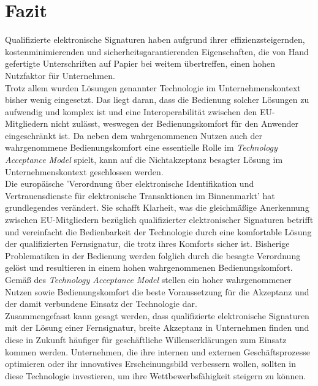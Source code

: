 \documentclass[deutsch]{lib/llncs/llncs}
\begin{document}
\section{Fazit}
Qualifizierte elektronische Signaturen haben aufgrund ihrer effizienzsteigernden, kostenminimierenden und sicherheitsgarantierenden Eigenschaften, die von Hand gefertigte Unterschriften auf Papier bei weitem übertreffen, einen hohen Nutzfaktor für Unternehmen. \\
Trotz allem wurden Lösungen genannter Technologie im Unternehmenskontext bisher wenig eingesetzt. Das liegt daran, dass die Bedienung solcher Lösungen zu aufwendig und komplex ist und eine Interoperabilität zwischen den EU-Mitgliedern nicht zulässt, weswegen der Bedienungskomfort für den Anwender eingeschränkt ist. Da neben dem wahrgenommenen Nutzen auch der wahrgenommene Bedienungskomfort eine essentielle Rolle im \textit{Technology Acceptance Model} spielt, kann auf die Nichtakzeptanz besagter Lösung im Unternehmenskontext geschlossen werden. \\
Die europäische 'Verordnung über elektronische Identifikation und Vertrauensdienste für elektronische Transaktionen im Binnenmarkt' hat grundlegendes verändert. Sie schafft Klarheit, was die gleichmäßige Anerkennung zwischen EU-Mitgliedern bezüglich qualifizierter elektronischer Signaturen betrifft und vereinfacht die Bedienbarkeit der Technologie durch eine komfortable Lösung der qualifizierten Fernsignatur, die trotz ihres Komforts sicher ist. Bisherige Problematiken in der Bedienung werden folglich durch die besagte Verordnung gelöst und resultieren in einem hohen wahrgenommenen Bedienungskomfort. \\
Gemäß des \textit{Technology Acceptance Model} stellen ein hoher wahrgenommener Nutzen sowie Bedienungskomfort die beste Voraussetzung für die Akzeptanz und der damit verbundene Einsatz der Technologie dar. \\
Zusammengefasst kann gesagt werden, dass qualifizierte elektronische Signaturen mit der Lösung einer Fernsignatur, breite Akzeptanz in Unternehmen finden und diese in Zukunft häufiger für geschäftliche Willenserklärungen zum Einsatz kommen werden.
Unternehmen, die ihre internen und externen Geschäftsprozesse optimieren oder ihr innovatives Erscheinungsbild verbessern wollen, sollten in diese Technologie investieren, um ihre Wettbewerbsfähigkeit steigern zu können.




\end{document}
